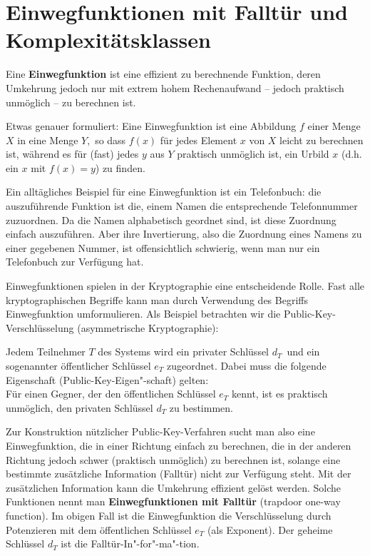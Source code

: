 \begin{refsegment}
\hypertarget{OneWayFunktion1}{}
\section{Einwegfunktionen mit Falltür und Komplexitätsklassen}
\label{OneWayFunktion1}
 
Eine {\bf Einwegfunktion} ist eine effizient zu
berechnende Funktion, deren Umkehrung jedoch nur mit
extrem hohem Rechenaufwand -- jedoch praktisch unmöglich -- zu berechnen ist.\par

Etwas genauer formuliert:  Eine Einwegfunktion ist eine Abbildung $ f $ einer Menge $ X $ in eine Menge $ Y, $ so dass $ f(x) $ für jedes Element $ x $ von $ X $ leicht zu berechnen ist, während es für (fast) jedes $ y $ aus $ Y $  praktisch unmöglich ist, ein Urbild $ x $ (d.h. ein $ x $ mit $ f(x)=y $) zu finden.\par

Ein alltägliches Beispiel für eine Einwegfunktion ist ein Telefonbuch: die auszuführende Funktion ist die, einem Namen die entsprechende Telefonnummer zuzuordnen. Da die Namen alphabetisch geordnet sind, ist diese Zuordnung einfach auszuführen. Aber ihre Invertierung, also die Zuordnung eines Namens zu einer gegebenen Nummer, ist offensichtlich schwierig, wenn man nur ein Telefonbuch zur Verfügung hat. \par

Einwegfunktionen spielen in der Kryptographie eine entscheidende Rolle. Fast alle kryptographischen Begriffe kann man durch Verwendung des Begriffs Einwegfunktion umformulieren. Als Beispiel betrachten wir die Public-Key-Verschlüsselung  (asymmetrische Kryptographie):\par

Jedem Teilnehmer $ T $ des Systems wird ein privater 
 Schlüssel $d_T$~\mbox{und} ein sogenannter öffentlicher
Schlüssel $ e_T $ zugeordnet. Dabei muss die folgende Eigenschaft (Public-Key-Eigen"-schaft)
gelten:\\
Für einen Gegner, der den öffentlichen Schlüssel $ e_T $ kennt, ist es praktisch unmöglich,
den privaten Schlüssel  $ d_T $ zu bestimmen.\par

Zur Konstruktion nützlicher Public-Key-Verfahren sucht man also eine Einwegfunktion, die in einer Richtung \glqq einfach\grqq {} zu berechnen, die in der anderen Richtung jedoch \glqq schwer\grqq {} (praktisch unmöglich) zu berechnen ist, solange eine bestimmte zusätzliche Information  (Falltür) nicht zur Verfügung steht. Mit der zusätzlichen Information kann die Umkehrung effizient gelöst werden. Solche Funktionen nennt man {\bf Einwegfunktionen mit Falltür} (trapdoor one-way function). Im obigen Fall ist die Einwegfunktion die Verschlüsselung durch Potenzieren mit dem öffentlichen Schl\"ussel $e_T$ (als Exponent). Der geheime Schlüssel $ d_T $ ist die Falltür-In"-for"-ma"-tion.\par


\end{refsegment}
